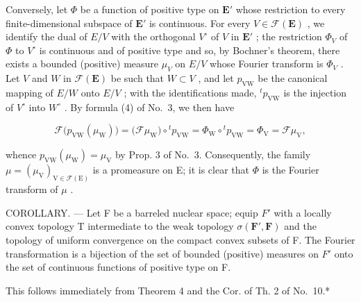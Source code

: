 Conversely, let \(\Phi\) be a function of positive type on \(\mathbf{E}'\) whose restriction to every finite-dimensional subspace of \(\mathbf{E}'\) is continuous. For every \(V \in \mathcal{F}(\mathbf{E})\) , we identify the dual of \(E/V\) with the orthogonal \(V^{\circ}\) of \(V\) in \(\mathbf{E}'\) ; the restriction \(\Phi_V\) of \(\Phi\) to \(V^{\circ}\) is continuous and of positive type and so, by Bochner's theorem, there exists a bounded (positive) measure \(\mu_V\) on \(E/V\) whose Fourier transform is \(\Phi_V\) . Let \(V\) and \(W\) in \(\mathcal{F}(\mathbf{E})\) be such that \(W \subset V\) , and let \(p_{\mathrm{VW}}\) be the canonical mapping of \(E/W\) onto \(E/V\) ; with the identifications made, \(^{t}p_{\mathrm{VW}}\) is the injection of \(V^{\circ}\) into \(W^{\circ}\) . By formula (4) of No.~3, we then have

\[
\mathcal {F} \big (p _ {\mathrm{VW}} (\mu_ {\mathrm{W}}) \big) = \big (\mathcal {F} \mu_ {\mathrm{W}} \big) \circ {} ^ {t} p _ {\mathrm{VW}} = \Phi_ {\mathrm{W}} \circ {} ^ {t} p _ {\mathrm{VW}} = \Phi_ {\mathrm{V}} = \mathcal {F} \mu_ {\mathrm{V}},
\]

whence \(p_{\mathrm{VW}}(\mu_{\mathrm{W}}) = \mu_{\mathrm{V}}\) by Prop. 3 of No.~3. Consequently, the family \(\mu = (\mu_{\mathrm{V}})_{\mathrm{V} \in \mathcal{F}(\mathrm{E})}\) is a promeasure on E; it is clear that \(\Phi\) is the Fourier transform of \(\mu\) .

COROLLARY. --- Let F be a barreled nuclear space; equip \(F'\) with a locally convex topology T intermediate to the weak topology \(\sigma(\mathbf{F}',\mathbf{F})\) and the topology of uniform convergence on the compact convex subsets of F. The Fourier transformation is a bijection of the set of bounded (positive) measures on \(F'\) onto the set of continuous functions of positive type on F.

This follows immediately from Theorem 4 and the Cor. of Th. 2 of No.~10.*


